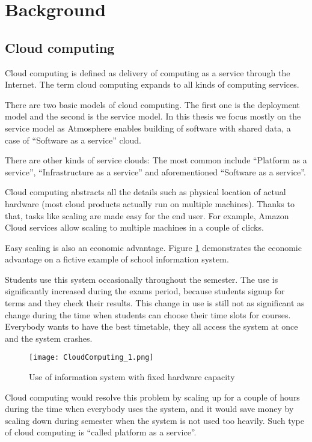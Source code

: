 \section{Background}

\subsection{Cloud computing}

Cloud computing is defined as delivery of computing as a service through the Internet. The term cloud computing expands to all kinds of computing services.

There are two basic models of cloud computing. The first one is the deployment model and the second is the service model. In this thesis we focus mostly on the service model as Atmosphere enables building of software with shared data, a case of ``Software as a service'' cloud. 

There are other kinds of service clouds: The most common include ``Platform as a service'', ``Infrastructure as a service'' and aforementioned ``Software as a service''.

Cloud computing abstracts all the details such as physical location of actual hardware (most cloud products actually run on multiple machines). Thanks to that, tasks like scaling are made easy for the end user. For example, Amazon Cloud services allow scaling to multiple machines in a couple of clicks. \citep{amazon}

Easy scaling is also an economic advantage. Figure \ref{fig:1} demonstrates the economic advantage on a fictive example of school information system.

Students use this system occasionally throughout the semester. The use is significantly increased during the exams period, because students signup for terms and they check their results. This change in use is still not as significant as change during the time when students can choose their time slots for courses. Everybody wants to have the best timetable, they all access the system at once and the system crashes.

\begin{figure}[ht!]
\centering
\texttt{[image: CloudComputing\_1.png]}
\caption{Use of information system with fixed hardware capacity \label{fig:1}}
\end{figure}

Cloud computing would resolve this problem by scaling up for a couple of hours during the time when everybody uses the system, and it would save money by scaling down during semester when the system is not used too heavily. Such type of cloud computing is ``called platform as a service''. \citep{paas}

